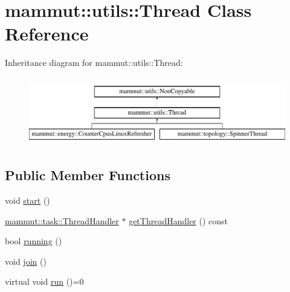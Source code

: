 \hypertarget{classmammut_1_1utils_1_1Thread}{\section{mammut\-:\-:utils\-:\-:Thread Class Reference}
\label{classmammut_1_1utils_1_1Thread}
}
Inheritance diagram for mammut\-:\-:utils\-:\-:Thread\-:\begin{figure}[H]
\begin{center}
\leavevmode
\includegraphics[height=3.000000cm]{classmammut_1_1utils_1_1Thread}
\end{center}
\end{figure}
\subsection*{Public Member Functions}
\begin{DoxyCompactItemize}
\item 
void \hyperlink{classmammut_1_1utils_1_1Thread_a7c09cabe54b1626a574eca403d3f569c}{start} ()
\item 
\hyperlink{classmammut_1_1task_1_1ThreadHandler}{mammut\-::task\-::\-Thread\-Handler} $\ast$ \hyperlink{classmammut_1_1utils_1_1Thread_aace614531a18e9d456abcd5ca4d460db}{get\-Thread\-Handler} () const 
\item 
bool \hyperlink{classmammut_1_1utils_1_1Thread_ab24ad2bd0b96b4a27420471d9e863e04}{running} ()
\item 
void \hyperlink{classmammut_1_1utils_1_1Thread_a5d5f68a806285803e815debc6dd0f278}{join} ()
\item 
virtual void \hyperlink{classmammut_1_1utils_1_1Thread_afc8a6df35c4f0417e6be899df973cca7}{run} ()=0
\end{DoxyCompactItemize}


